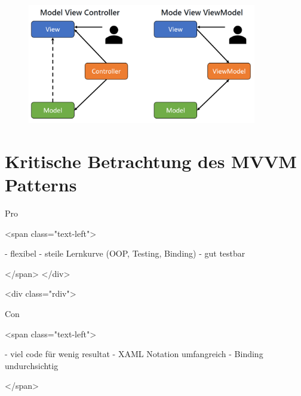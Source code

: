 \documentclass[titlepage=false,12pt]{scrreprt}
\begin{document}
\begin{figure}
	\includegraphics[width=10cm]{MVC_vs_MVVM.PNG}
\end{figure}

\chapter{Kritische Betrachtung des MVVM Patterns}



Pro

<span class="text-left">

- flexibel
- steile Lernkurve (OOP, Testing, Binding)
- gut testbar

</span>
</div>

<div class="rdiv">

Con

<span class="text-left">

- viel code für wenig resultat
- XAML Notation umfangreich
- Binding undurchsichtig

</span>
\end{document}
